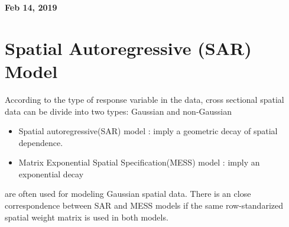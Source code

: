 \documentclass[11pt]{article}
\begin{document}
%

\newcommand{\Ito}{$It\hat{o}$'$s~Lemma$}

\newcommand\ind{\stackrel{\rm ind}{\sim}}
\newcommand\iid{\stackrel{\rm iid}{\sim}}
\renewcommand\c{\mathbf{c}}
\newcommand\y{\mathbf{y}}
\newcommand\z{\mathbf{z}}
\renewcommand\P{\mathbf{P}}
\newcommand\W{\mathbf{W}}
\newcommand\X{\mathbf{X}}
\newcommand\Y{\mathbf{Y}}
\newcommand\Z{\mathbf{Z}}
\newcommand\J{{\cal J}}
\newcommand\B{{\cal B}}
\newcommand\K{{\cal K}}
\newcommand\N{{\rm N}}
\newcommand\bs{\boldsymbol}
\newcommand\bth{\bs\theta}
\newcommand\bbe{\bs\beta}
\renewcommand\*{^\star}

\def\spacingset#1{\renewcommand{\baselinestretch}%
{#1}\small\normalsize} \spacingset{1}



  \bigskip
  \bigskip
  \bigskip
  \begin{center}
    {\LARGE\bf Feb 14, 2019 }
  \end{center}
  \medskip



\spacingset{1.45}



\section{Spatial Autoregressive (SAR) Model}
According to the type of response variable in the data, cross sectional spatial data can be divide into two types: Gaussian and non-Gaussian


\begin{itemize}
	\item Spatial autoregressive(SAR) model : imply a geometric decay of spatial dependence.
	\item Matrix Exponential Spatial Specification(MESS) model : imply an exponential decay
\end{itemize}
are often used for modeling Gaussian spatial data. There is an close correspondence between SAR and MESS models if the same row-standarized spatial weight matrix is used in both models.
\end{document}
